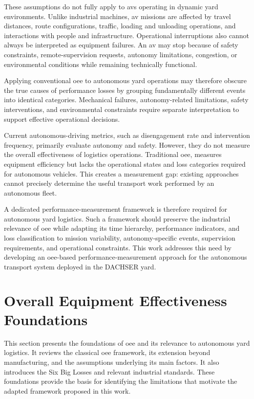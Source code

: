 These assumptions do not fully apply to \glspl{av} operating in dynamic yard environments. Unlike industrial machines, \gls{av} missions are affected by travel distances, route configurations, traffic, loading and unloading operations, and interactions with people and infrastructure. Operational interruptions also cannot always be interpreted as equipment failures. An \gls{av} may stop because of safety constraints, remote-supervision requests, autonomy limitations, congestion, or environmental conditions while remaining technically functional.

Applying conventional \gls{oee} to autonomous yard operations may therefore obscure the true causes of performance losses by grouping fundamentally different events into identical categories. Mechanical failures, autonomy-related limitations, safety interventions, and environmental constraints require separate interpretation to support effective operational decisions.

Current autonomous-driving metrics, such as disengagement rate and intervention frequency, primarily evaluate autonomy and safety. However, they do not measure the overall effectiveness of logistics operations. Traditional \gls{oee}, measures equipment efficiency but lacks the operational states and loss categories required for autonomous vehicles. This creates a measurement gap: existing approaches cannot precisely determine the useful transport work performed by an autonomous fleet.

A dedicated performance-measurement framework is therefore required for autonomous yard logistics. Such a framework should preserve the industrial relevance of \gls{oee} while adapting its time hierarchy, performance indicators, and loss classification to mission variability, autonomy-specific events, supervision requirements, and operational constraints. This work addresses this need by developing an \gls{oee}-based performance-measurement approach for the autonomous transport system deployed in the DACHSER yard.

\section{Overall Equipment Effectiveness Foundations}

This section presents the foundations of \gls{oee} and its relevance to autonomous yard logistics. It reviews the classical \gls{oee} framework, its extension beyond manufacturing, and the assumptions underlying its main factors. It also introduces the Six Big Losses and relevant industrial standards. These foundations provide the basis for identifying the limitations that motivate the adapted framework proposed in this work.
